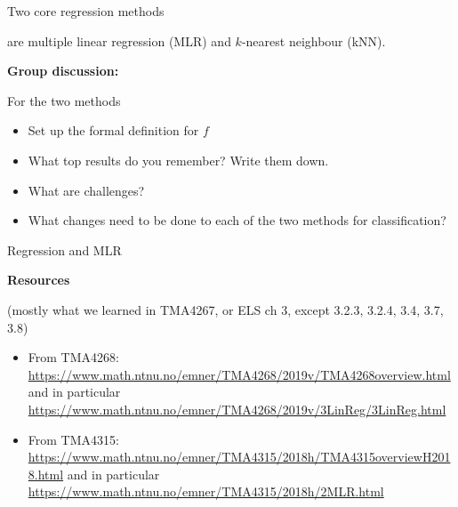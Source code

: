 \documentclass[
  ignorenonframetext,
]{beamer}
\providecommand{\tightlist}{%
  \setlength{\itemsep}{0pt}\setlength{\parskip}{0pt}}
\begin{document}
\begin{frame}

\begin{block}{Two core regression methods}

are multiple linear regression (MLR) and \(k\)-nearest neighbour (kNN).

\textbf{Group discussion:}

For the two methods

\begin{itemize}
\tightlist
\item
  Set up the formal definition for \(f\)
\item
  What top results do you remember? Write them down.
\item
  What are challenges?
\item
  What changes need to be done to each of the two methods for
  classification?
\end{itemize}

\end{block}

\end{frame}

\begin{frame}

\begin{block}{Regression and MLR}

\textbf{Resources}

(mostly what we learned in TMA4267, or ELS ch 3, except 3.2.3, 3.2.4,
3.4, 3.7, 3.8)

\begin{itemize}
\tightlist
\item
  From TMA4268:
  \url{https://www.math.ntnu.no/emner/TMA4268/2019v/TMA4268overview.html}
  and in particular
  \url{https://www.math.ntnu.no/emner/TMA4268/2019v/3LinReg/3LinReg.html}
\item
  From TMA4315:
  \url{https://www.math.ntnu.no/emner/TMA4315/2018h/TMA4315overviewH2018.html}
  and in particular
  \url{https://www.math.ntnu.no/emner/TMA4315/2018h/2MLR.html}
\end{itemize}

\end{block}

\end{frame}
\end{document}

